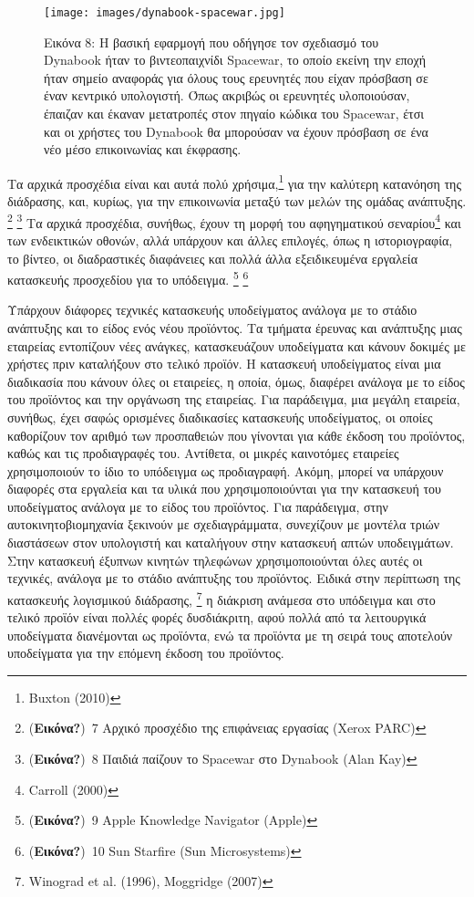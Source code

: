 \documentclass[
]{article}
\begin{document}
\leavevmode{}%
\begin{figure}
\hypertarget{fig:dynabook-spacewar}{%
\centering
\texttt{[image: images/dynabook-spacewar.jpg]}
\caption{Εικόνα 8: Η βασική εφαρμογή που οδήγησε τον σχεδιασμό του
Dynabook ήταν το βιντεοπαιχνίδι Spacewar, το οποίο εκείνη την εποχή ήταν
σημείο αναφοράς για όλους τους ερευνητές που είχαν πρόσβαση σε έναν
κεντρικό υπολογιστή. Όπως ακριβώς οι ερευνητές υλοποιούσαν, έπαιζαν και
έκαναν μετατροπές στον πηγαίο κώδικα του Spacewar, έτσι και οι χρήστες
του Dynabook θα μπορούσαν να έχουν πρόσβαση σε ένα νέο μέσο επικοινωνίας
και έκφρασης.}\label{fig:dynabook-spacewar}
}
\end{figure}

Τα αρχικά προσχέδια είναι και αυτά πολύ χρήσιμα,\footnote{Buxton (2010)}
για την καλύτερη κατανόηση της διάδρασης, και, κυρίως, για την
επικοινωνία μεταξύ των μελών της ομάδας ανάπτυξης. \footnote{(\textbf{Εικόνα?})~7
  Αρχικό προσχέδιο της επιφάνειας εργασίας (Xerox PARC)} \footnote{(\textbf{Εικόνα?})~8
  Παιδιά παίζουν το Spacewar στο Dynabook (Alan Kay)} Τα αρχικά
προσχέδια, συνήθως, έχουν τη μορφή του αφηγηματικού σεναρίου\footnote{Carroll
  (2000)} και των ενδεικτικών οθονών, αλλά υπάρχουν και άλλες επιλογές,
όπως η ιστοριογραφία, το βίντεο, οι διαδραστικές διαφάνειες και πολλά
άλλα εξειδικευμένα εργαλεία κατασκευής προσχεδίου για το υπόδειγμα.
\footnote{(\textbf{Εικόνα?})~9 Apple Knowledge Navigator (Apple)}
\footnote{(\textbf{Εικόνα?})~10 Sun Starfire (Sun Microsystems)}

Υπάρχουν διάφορες τεχνικές κατασκευής υποδείγματος ανάλογα με το στάδιο
ανάπτυξης και το είδος ενός νέου προϊόντος. Τα τμήματα έρευνας και
ανάπτυξης μιας εταιρείας εντοπίζουν νέες ανάγκες, κατασκευάζουν
υποδείγματα και κάνουν δοκιμές με χρήστες πριν καταλήξουν στο τελικό
προϊόν. Η κατασκευή υποδείγματος είναι μια διαδικασία που κάνουν όλες οι
εταιρείες, η οποία, όμως, διαφέρει ανάλογα με το είδος του προϊόντος και
την οργάνωση της εταιρείας. Για παράδειγμα, μια μεγάλη εταιρεία,
συνήθως, έχει σαφώς ορισμένες διαδικασίες κατασκευής υποδείγματος, οι
οποίες καθορίζουν τον αριθμό των προσπαθειών που γίνονται για κάθε
έκδοση του προϊόντος, καθώς και τις προδιαγραφές του. Αντίθετα, οι
μικρές καινοτόμες εταιρείες χρησιμοποιούν το ίδιο το υπόδειγμα ως
προδιαγραφή. Ακόμη, μπορεί να υπάρχουν διαφορές στα εργαλεία και τα
υλικά που χρησιμοποιούνται για την κατασκευή του υποδείγματος ανάλογα με
το είδος του προϊόντος. Για παράδειγμα, στην αυτοκινητοβιομηχανία
ξεκινούν με σχεδιαγράμματα, συνεχίζουν με μοντέλα τριών διαστάσεων στον
υπολογιστή και καταλήγουν στην κατασκευή απτών υποδειγμάτων. Στην
κατασκευή έξυπνων κινητών τηλεφώνων χρησιμοποιούνται όλες αυτές οι
τεχνικές, ανάλογα με το στάδιο ανάπτυξης του προϊόντος. Ειδικά στην
περίπτωση της κατασκευής λογισμικού διάδρασης, \footnote{Winograd et al.
  (1996), Moggridge (2007)} η διάκριση ανάμεσα στο υπόδειγμα και στο
τελικό προϊόν είναι πολλές φορές δυσδιάκριτη, αφού πολλά από τα
λειτουργικά υποδείγματα διανέμονται ως προϊόντα, ενώ τα προϊόντα με τη
σειρά τους αποτελούν υποδείγματα για την επόμενη έκδοση του προϊόντος.
\end{document}

